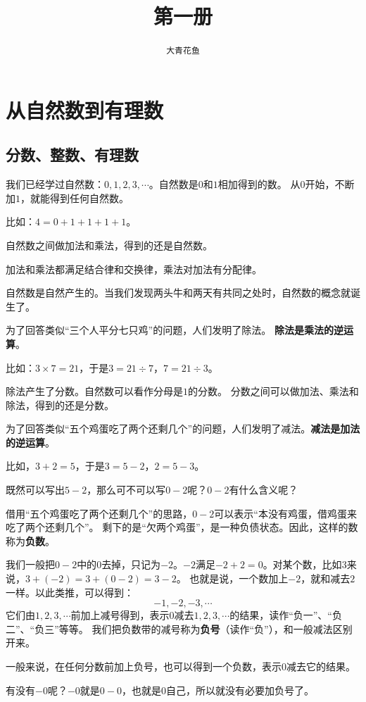 \documentclass[12pt,UTF8,fontset=none]{ctexbook}
\title{\zihao{0} \bfseries 第一册}
\author{\zihao{2} \texttt{大青花鱼}}
\date{}
\begin{document}
\maketitle
\tableofcontents
\newpage

\chapter{从自然数到有理数}

\section{分数、整数、有理数}
我们已经学过自然数：$0,1,2,3,\cdots$。自然数是$0$和$1$相加得到的数。
从$0$开始，不断加$1$，就能得到任何自然数。

比如：$4 = 0 + 1 + 1 + 1 + 1$。

自然数之间做加法和乘法，得到的还是自然数。

加法和乘法都满足结合律和交换律，乘法对加法有分配律。

自然数是自然产生的。当我们发现两头牛和两天有共同之处时，自然数的概念就诞生了。

为了回答类似“三个人平分七只鸡”的问题，人们发明了除法。
\textbf{除法是乘法的逆运算}。

比如：$3 \times 7 = 21$，于是$3 = 21 \div 7$，$7 = 21 \div 3$。

除法产生了分数。自然数可以看作分母是$1$的分数。
分数之间可以做加法、乘法和除法，得到的还是分数。

为了回答类似“五个鸡蛋吃了两个还剩几个”的问题，人们发明了减法。\textbf{减法是加法的逆运算}。

比如，$3+2=5$，于是$3 = 5 - 2$，$2 = 5 - 3$。

既然可以写出$5-2$，那么可不可以写$0-2$呢？$0-2$有什么含义呢？

借用“五个鸡蛋吃了两个还剩几个”的思路，$0-2$可以表示“本没有鸡蛋，借鸡蛋来吃了两个还剩几个”。
剩下的是“欠两个鸡蛋”，是一种负债状态。因此，这样的数称为\textbf{负数}。

我们一般把$0-2$中的$0$去掉，只记为$-2$。$-2$满足$-2+2=0$。对某个数，比如$3$来说，$3+(-2)=3+(0-2)=3-2$。
也就是说，一个数加上$-2$，就和减去$2$一样。以此类推，可以得到：
$$ -1, -2, -3, \cdots $$
它们由$1,2,3,\cdots$前加上减号得到，表示$0$减去$1,2,3,\cdots$的结果，读作“负一”、“负二”、“负三”等等。
我们把负数带的减号称为\textbf{负号}（读作“负”），和一般减法区别开来。

一般来说，在任何分数前加上负号，也可以得到一个负数，表示$0$减去它的结果。

有没有$-0$呢？$-0$就是$0-0$，也就是$0$自己，所以就没有必要加负号了。
\end{document}
